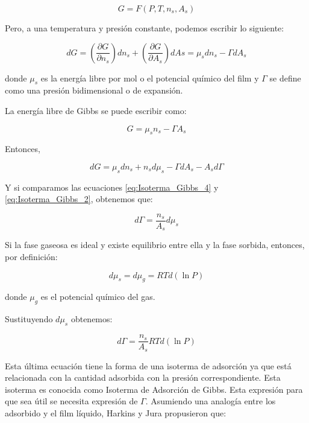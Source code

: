 \documentclass[11pt]{book}
\begin{document}
\begin{equation}
    \label{eq:Isoterma_Gibbs_1}
    G = F(P, T, n_s, A_s)
\end{equation}

Pero, a una temperatura y presión constante, podemos escribir lo siguiente:

\begin{equation}
    \label{eq:Isoterma_Gibbs_2}
    dG = \left( \frac{\partial G}{\partial n_s} \right) dn_s + \left( \frac{\partial G}{\partial A_s} \right) dAs = \mu_s dn_s - \Gamma dA_s
\end{equation}

donde $\mu_s$ es la energía libre por mol o el potencial químico del film y $\Gamma$ se define como una presión bidimensional o de expansión.

La energía libre de Gibbs se puede escribir como:

\begin{equation}
    \label{eq:Isoterma_Gibbs_3}
    G = \mu_s n_s - \Gamma A_s
\end{equation}

Entonces,

\begin{equation}
    \label{eq:Isoterma_Gibbs_4}
    dG = \mu_s dn_s + n_s d\mu_s - \Gamma dA_s - A_s d\Gamma
\end{equation}

Y si comparamos las ecuaciones \ref{eq:Isoterma_Gibbs_4} y \ref{eq:Isoterma_Gibbs_2}, obtenemos que:

\begin{equation}
    \label{eq:Isoterma_Gibbs_5}
    d\Gamma = \frac{n_s}{A_s} d\mu_s
\end{equation}

Si la fase gaseosa es ideal y existe equilibrio entre ella y la fase sorbida, entonces, por definición:

\begin{equation}
    \label{eq:Isoterma_Gibbs_6}
    d\mu_s = d\mu_g = RT d\left( \ln{P} \right)
\end{equation}

donde $\mu_g$ es el potencial químico del gas.

Sustituyendo $d\mu_s$ obtenemos:

\begin{equation}
    \label{eq:Isoterma_Gibbs_7}
    d\Gamma = \frac{n_s}{A_s} RT d\left( \ln{P} \right)
\end{equation}

Esta última ecuación tiene la forma de una isoterma de adsorción ya que está relacionada con la cantidad adsorbida con la presión correspondiente. Esta isoterma es conocida como Isoterma de Adsorción de Gibbs. Esta expresión para que sea útil se necesita expresión de $\Gamma$. Asumiendo una analogía entre los adsorbido y el film líquido, Harkins y Jura propusieron que:
\end{document}
